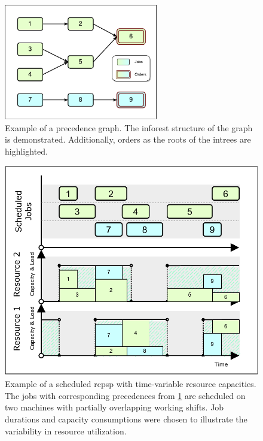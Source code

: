 \begin{figure}[p]
    \centering
    \includegraphics[width=0.6\textwidth]{img/Inforest.pdf}
    \caption{
        Example of a precedence graph.
        The inforest structure of the graph is demonstrated.
        Additionally, orders as the roots of the intrees are highlighted.}
    \label{fig:inforest}
\end{figure}

\begin{figure}[p]
    \centering
    \includegraphics[width=0.999\textwidth]{img/Schedule.pdf}
    \caption{
        Example of a scheduled \ac{rcpsp} with time-variable resource capacities.
        The jobs with corresponding precedences from \cref{fig:inforest} are scheduled
        on two machines with partially overlapping working shifts.
        Job durations and capacity consumptions were chosen to illustrate the variability
        in resource utilization.
    }
    \label{fig:schedule}
\end{figure}

